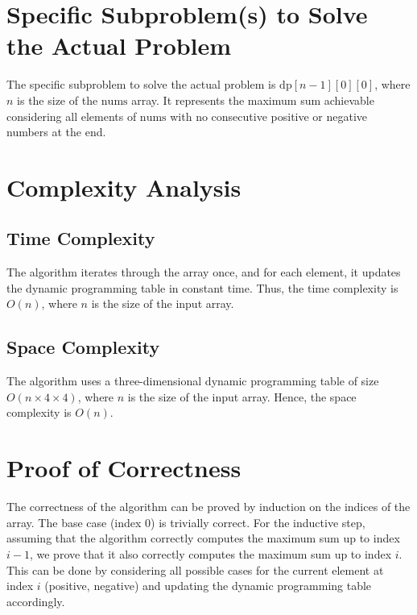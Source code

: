 \documentclass{article}
\begin{document}
\section{Specific Subproblem(s) to Solve the Actual Problem}
    The specific subproblem to solve the actual problem is $\text{dp}[n-1][0][0]$, where $n$ is the size of the $\text{nums}$ array. It represents the maximum sum achievable considering all elements of $\text{nums}$ with no consecutive positive or negative numbers at the end.

\section{Complexity Analysis}
    \subsection{Time Complexity}
        The algorithm iterates through the array once, and for each element, it updates the dynamic programming table in constant time. Thus, the time complexity is $O(n)$, where $n$ is the size of the input array.

    \subsection{Space Complexity}
        The algorithm uses a three-dimensional dynamic programming table of size $O(n \times 4 \times 4)$, where $n$ is the size of the input array. Hence, the space complexity is $O(n)$.
    
\section{Proof of Correctness}
    The correctness of the algorithm can be proved by induction on the indices of the array. The base case (index 0) is trivially correct. For the inductive step, assuming that the algorithm correctly computes the maximum sum up to index $i-1$, we prove that it also correctly computes the maximum sum up to index $i$. This can be done by considering all possible cases for the current element at index $i$ (positive, negative) and updating the dynamic programming table accordingly.
\end{document}

